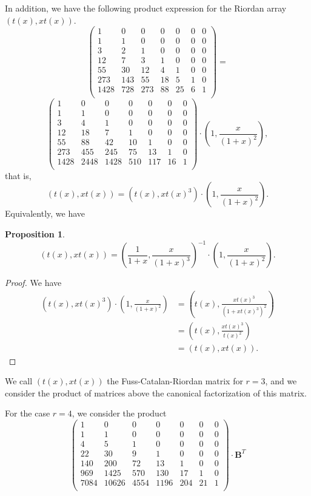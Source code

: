 \documentclass[12pt,reqno]{article}
\newtheorem{proposition}[theorem]{Proposition}
\theoremstyle{definition}
\begin{document}
In addition, we have the following product expression for the Riordan array $(t(x),xt(x))$.
$$\left(
\begin{array}{ccccccc}
1& 0 & 0 & 0 & 0 & 0 & 0 \\
1 & 1 & 0 & 0 & 0 & 0 & 0 \\
3 & 2 & 1 & 0 & 0 & 0 & 0 \\
12 & 7 & 3 & 1 & 0 & 0 & 0 \\
55 & 30 & 12 & 4 & 1 & 0 & 0 \\
273 & 143 & 55 & 18 & 5 & 1 & 0 \\
1428 & 728 & 273 & 88 & 25 & 6 & 1 \\
\end{array}\right)=$$
$$\left(
\begin{array}{ccccccc}
1& 0 & 0 & 0 & 0 & 0 & 0 \\
1 & 1 & 0 & 0 & 0 & 0 & 0 \\
3 & 4 & 1 & 0 & 0 & 0 & 0 \\
12 & 18 & 7 & 1 & 0 & 0 & 0 \\
55 &88 & 42 & 10 & 1 & 0 & 0 \\
273 & 455 & 245 & 75 & 13 & 1 & 0 \\
1428 & 2448 & 1428 & 510 & 117 & 16 & 1 \\
\end{array}\right) \cdot \left(1, \frac{x}{(1+x)^2}\right),$$ that is,
$$(t(x), xt(x))= (t(x), xt(x)^3) \cdot \left(1, \frac{x}{(1+x)^2}\right).$$
Equivalently, we have
\begin{proposition}
$$(t(x), xt(x))=\left(\frac{1}{1+x}, \frac{x}{(1+x)^3}\right)^{-1} \cdot  \left(1, \frac{x}{(1+x)^2}\right).$$
\end{proposition}
\begin{proof}
We have
\begin{align*}
(t(x), xt(x)^3)\cdot \left(1,\frac{x}{(1+x)^2}\right)&=\left(t(x), \frac{xt(x)^3}{(1+xt(x)^3)^2}\right)\\
&=\left(t(x), \frac{xt(x)^3}{t(x)^2}\right)\\
&=(t(x), xt(x)).\end{align*}
\end{proof}
We call $(t(x), xt(x))$ the Fuss-Catalan-Riordan matrix for $r=3$, and we consider the product of matrices above the canonical factorization of this matrix.

For the case $r=4$, we consider the product
$$\left(
\begin{array}{ccccccc}
1& 0 & 0 & 0 & 0 & 0 & 0 \\
1 & 1 & 0 & 0 & 0 & 0 & 0 \\
4 & 5 & 1 & 0 & 0 & 0 & 0 \\
22 & 30 & 9 & 1 & 0 & 0 & 0 \\
140 & 200 & 72 & 13 & 1 & 0 & 0 \\
969 & 1425 & 570 & 130 & 17 & 1 & 0 \\
7084 & 10626 & 4554 & 1196 & 204 & 21 & 1 \\
\end{array}\right)\cdot \mathbf{B}^T$$
\end{document}
